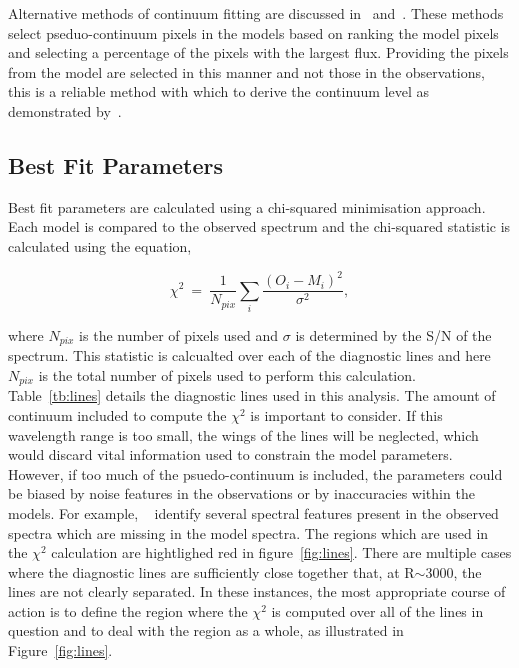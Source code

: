 \documentclass[12pt]{article}
\begin{document}

Alternative methods of continuum fitting are discussed in~\cite{2010MNRAS.407.1203D} and~\cite{2011A&A...527A..50E}.
These methods select pseduo-continuum pixels in the models based on ranking the model pixels and selecting a percentage of the pixels with the largest flux.
Providing the pixels from the model are selected in this manner and not those in the observations, this is a reliable method with which to derive the continuum level as demonstrated by~\cite{2015ApJ...806...21D}.

\subsection{Best Fit Parameters} %
\label{sub:best_fit_parameters}

Best fit parameters are calculated using a chi-squared minimisation approach.
Each model is compared to the observed spectrum
and the chi-squared statistic is calculated using the equation,

\begin{equation}
    \chi^{2}~=~\frac{1}{N_{pix}}\sum\limits_{i}{\frac{(O_{i} - M_{i})^{2}}{\sigma^{2}}},
\end{equation}

where $N_{pix}$ is the number of pixels used and
$\sigma$ is determined by the S/N of the spectrum.
This statistic is calcualted over each of the diagnostic lines and here $N_{pix}$ is the total number of pixels used to perform this calculation.
Table~\ref{tb:lines} details the diagnostic lines used in this analysis.
The amount of continuum included to compute the $\chi^{2}$ is important to consider.
If this wavelength range is too small, the wings of the lines will be neglected,
which would discard vital information used to constrain the model parameters.
However, if too much of the psuedo-continuum is included, the parameters could be biased by noise features in the observations or by inaccuracies within the models.
For example,
~\cite{2014PhDT.........G} identify several spectral features present in the observed spectra which are missing in the model spectra.
The regions which are used in the $\chi^{2}$ calculation are hightlighed red in
figure~\ref{fig:lines}.
There are multiple cases where the diagnostic lines are sufficiently close together that, at R$\sim$3000,
the lines are not clearly separated.
In these instances, the most appropriate course of action is to define the region where the $\chi^{2}$ is computed over all of the lines in question and to deal with the region as a whole, as illustrated in Figure~\ref{fig:lines}.
\end{document}
